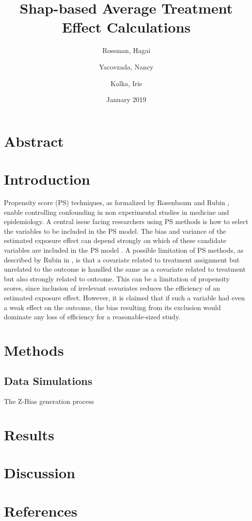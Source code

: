 \documentclass{article}
\title{Shap-based Average Treatment Effect Calculations}
\author{Rossman, Hagai
        \and
        Yacovzada, Nancy
        \and
        Kalka, Iris}
\date{January 2019}
\begin{document}
\maketitle

\section{Abstract}

\section{Introduction}
Propensity score (PS) techniques, as formalized by Rosenbaum and Rubin \cite{rosenbaum1983central}, enable  controlling confounding in non experimental studies in medicine and epidemiology. 
A central issue facing researchers using PS methods is how to select the variables to be included in the PS model. The bias and variance of the estimated exposure effect can depend strongly on which of these candidate variables are included in the PS model \cite{brookhart2006variable}.
A possible limitation of PS methods, as described by Rubin in \cite{rubin1997estimating}, is that a covariate related to treatment assignment but unrelated to the outcome is handled the same as a covariate related to treatment but also strongly related to outcome. 
This can be a limitation of propensity scores, since inclusion of irrelevant covariates reduces the efficiency of an estimated exposure effect.  However, it is claimed that if such a variable had even a weak effect on the outcome, the bias resulting from its exclusion would dominate any loss of efficiency for a reasonable-sized study. 
\section{Methods}
\subsection{Data Simulations}
The Z-Bias generation process \cite{myers2011effects}
\section{Results}

\section{Discussion}


\section{References}



\end{document}

